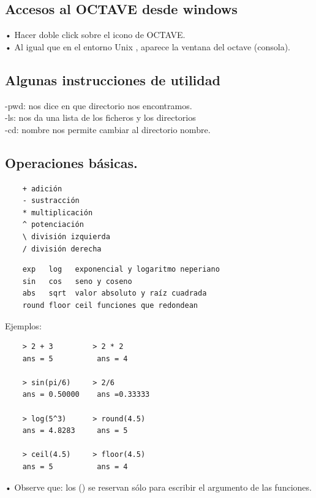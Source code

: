 \documentclass[a4,12pt]{article}
\begin{document}
\subsection{Accesos al OCTAVE desde windows}

• Hacer doble click sobre el icono de OCTAVE.\\
• Al igual que en el entorno Unix , aparece la ventana del octave (consola).\\

\subsection{Algunas instrucciones de utilidad }

-pwd: nos dice en que directorio nos encontramos.\\
-ls: nos da una lista de los ficheros y los directorios\\
-cd: nombre nos permite cambiar al directorio nombre.\\

\subsection{Operaciones básicas.}

\begin{verbatim}
    + adición
    - sustracción
    * multiplicación
    ^ potenciación
    \ división izquierda
    / división derecha
\end{verbatim}

\begin{verbatim}
    exp   log   exponencial y logaritmo neperiano
    sin   cos   seno y coseno
    abs   sqrt  valor absoluto y raíz cuadrada
    round floor ceil funciones que redondean
\end{verbatim}

Ejemplos:

\begin{verbatim}
    > 2 + 3         > 2 * 2
    ans = 5          ans = 4

    > sin(pi/6)     > 2/6
    ans = 0.50000    ans =0.33333

    > log(5^3)      > round(4.5)
    ans = 4.8283     ans = 5

    > ceil(4.5)     > floor(4.5)
    ans = 5          ans = 4
\end{verbatim}

• Observe que: los () se reservan sólo para escribir el argumento de las funciones.\\
\end{document}
